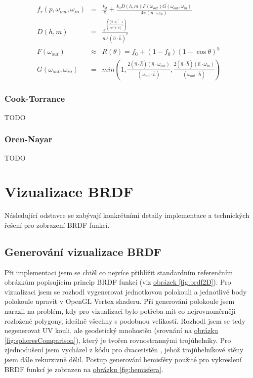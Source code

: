 \documentclass[czech,master,dept460,male,cpp,cpdeclaration]{diploma}
\newcommand{\uvec}[1]{\hat{#1}}
\begin{document}
\begin{eqnarray}
  f_r\left(p,\omega_{out},\omega_{in}\right) & = & \frac{k_d}{\pi} + \frac{k_sD(h,m)F(\omega_{out})G(\omega_{out},\omega_{in})}{4\pi (n\cdot \omega_{in})}\label{eq:TorranceSparrow}\\
  D(h,m) & = & \frac{e^{\left(\frac{(\uvec{n}\cdot \uvec{h})^2-1}{m^2(\uvec{n}\cdot \uvec{h})^2}\right)}}{m^2(\uvec{n}\cdot \uvec{h})^2}\\
  F(\omega_{out}) & \approx & R(\theta) = f_0 + (1-f_0)(1-\cos\theta)^5\\
  G(\omega_{out},\omega_{in}) & = & min \left( 1, \frac{2 ( \uvec{n} \cdot \uvec{h} ) ( \uvec{n} \cdot \omega_{out} )
  }{ ( \omega_{out} \cdot \uvec{h} ) },\frac{ 2 ( \uvec{n} \cdot \uvec{h} ) ( \uvec{n} \cdot \omega_{in} ) }{ ( \omega_{out} \cdot \uvec{h} ) } \right)
\end{eqnarray}
\subsubsection{Cook-Torrance}
TODO
\subsubsection{Oren-Nayar}
TODO

\clearpage
\section{Vizualizace BRDF}
Následující odstavce se zabývají konkrétními detaily implementace a technických řešení pro zobrazení BRDF funkcí.  

\subsection{Generování vizualizace BRDF}
Při implementaci jsem se chtěl co nejvíce přiblížit standardním referenčním obrázkům popisujícím princip BRDF funkcí (viz \hyperref[fig:brdf2D]{obrázek \ref{fig:brdf2D}}). Pro vizualizaci jsem se rozhodl vygenerovat jednotkovou polokouli a jednotlivé body polokoule upravit v OpenGL Vertex shaderu. Při generování polokoule jsem narazil na problém, kdy pro vizualizaci bylo potřeba mít co nejrovnoměrněji rozložené polygony, ideálně všechny s podobnou velikostí. Rozhodl jsem se tedy negenerovat UV kouli, ale geodetický mnohostěn (srovnání na \hyperref[fig:spheresComparison]{obrázku \ref{fig:spheresComparison}}), který je tvořen rovnostrannými trojúhelníky. Pro zjednodušení jsem vycházel z kódu pro dvacetistěn \cite{OpenGLSphere}, jehož trojúhelníkové stěny jsem dále rekurzivně dělil. Postup generování hemisféry použité pro vykreslení BRDF funkcí je zobrazen na \hyperref[fig:hemisfera]{obrázku \ref{fig:hemisfera}}.
\end{document}
